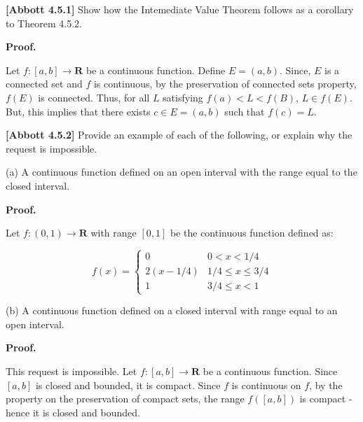 \documentclass[10pt]{article}
\begin{document}
\textbf{[Abbott 4.5.1] }Show how the Intemediate Value Theorem follows as a corollary to Theorem 4.5.2.



\textbf{Proof.} 



Let $\displaystyle f:[ a,b]\rightarrow \mathbf{R}$ be a continuous function. Define $\displaystyle E=( a,b)$. Since, $\displaystyle E$ is a connected set and $\displaystyle f$ is continuous, by the preservation of connected sets property, $\displaystyle f( E)$ is connected. Thus, for all $\displaystyle L$ satisfying $\displaystyle f( a) < L< f( B)$, $\displaystyle L\in f( E)$. But, this implies that there exists $\displaystyle c\in E=( a,b)$ such that $\displaystyle f( c) =L$.



\textbf{[Abbott 4.5.2] }Provide an example of each of the following, or explain why the request is impossible. 



(a) A continuous function defined on an open interval with the range equal to the closed interval.



\textbf{Proof.}



Let $\displaystyle f:( 0,1)\rightarrow \mathbf{R}$ with range $\displaystyle [ 0,1]$ be the continuous function defined as:




\begin{equation*}
f( x) =\begin{cases}
0 & 0< x< 1/4\\
2( x-1/4) & 1/4\leq x\leq 3/4\\
1 & 3/4\leq x< 1
\end{cases}
\end{equation*}


(b) A continuous function defined on a closed interval with range equal to an open interval.



\textbf{Proof.}



This request is impossible. Let $\displaystyle f:[ a,b]\rightarrow \mathbf{R}$ be a continuous function. Since $\displaystyle [ a,b]$ is closed and bounded, it is compact. Since $\displaystyle f$ is continuous on $\displaystyle f$, by the property on the preservation of compact sets, the range $\displaystyle f([ a,b])$ is compact - hence it is closed and bounded. 
\end{document}
